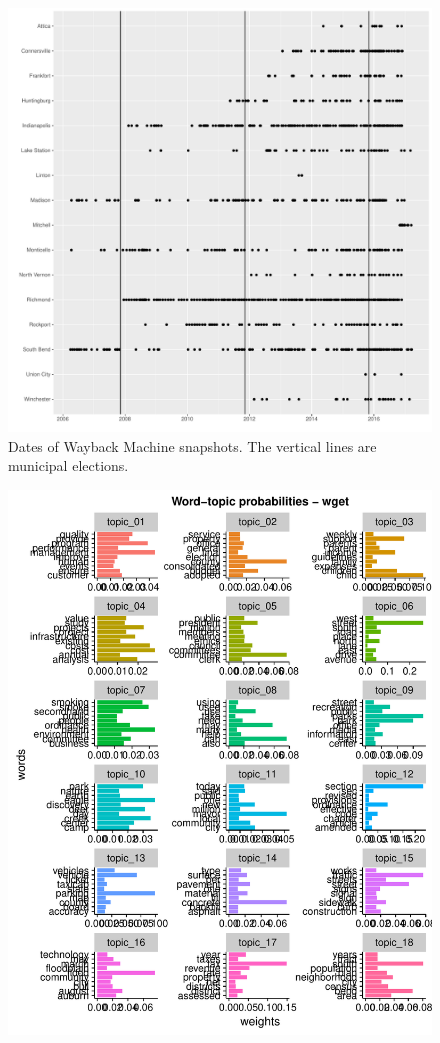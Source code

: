 \documentclass[11pt]{article}
\begin{document}
\begin{figure}[!ht]
	\centering
	\caption{Dates of Wayback Machine snapshots. The vertical lines are municipal elections.}
	\label{snapshots}
	\includegraphics[width=\linewidth]{figures/Snapshots.pdf}
\end{figure}


\begin{figure}[!ht]
	\centering
	\includegraphics[width=\linewidth]{figures/wtp_current.pdf}
\end{figure}
\end{document}
